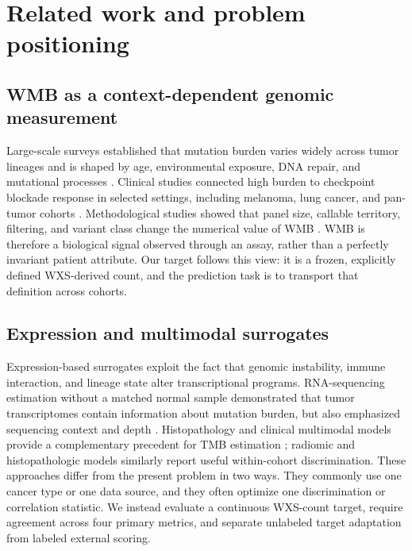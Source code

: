 \documentclass[11pt]{article}
\begin{document}
\section{Related work and problem positioning}
\subsection{WMB as a context-dependent genomic measurement}
Large-scale surveys established that mutation burden varies widely across tumor lineages and is shaped by age, environmental exposure, DNA repair, and mutational processes \citep{ZR2017f004a,RM2019bd13b}. Clinical studies connected high burden to checkpoint blockade response in selected settings, including melanoma, lung cancer, and pan-tumor cohorts \citep{MD2018d4430,AM2017f218c,PA2019f4932}. Methodological studies showed that panel size, callable territory, filtering, and variant class change the numerical value of WMB \citep{M2017ddb97,D20209d1b5}. WMB is therefore a biological signal observed through an assay, rather than a perfectly invariant patient attribute. Our target follows this view: it is a frozen, explicitly defined WXS-derived count, and the prediction task is to transport that definition across cohorts.

\subsection{Expression and multimodal surrogates}
Expression-based surrogates exploit the fact that genomic instability, immune interaction, and lineage state alter transcriptional programs. RNA-sequencing estimation without a matched normal sample demonstrated that tumor transcriptomes contain information about mutation burden, but also emphasized sequencing context and depth \citep{Bailey2022TMBRNA}. Histopathology and clinical multimodal models provide a complementary precedent for TMB estimation \citep{Huang2022TMBHistology}; radiomic and histopathologic models similarly report useful within-cohort discrimination. These approaches differ from the present problem in two ways. They commonly use one cancer type or one data source, and they often optimize one discrimination or correlation statistic. We instead evaluate a continuous WXS-count target, require agreement across four primary metrics, and separate unlabeled target adaptation from labeled external scoring.
\end{document}
